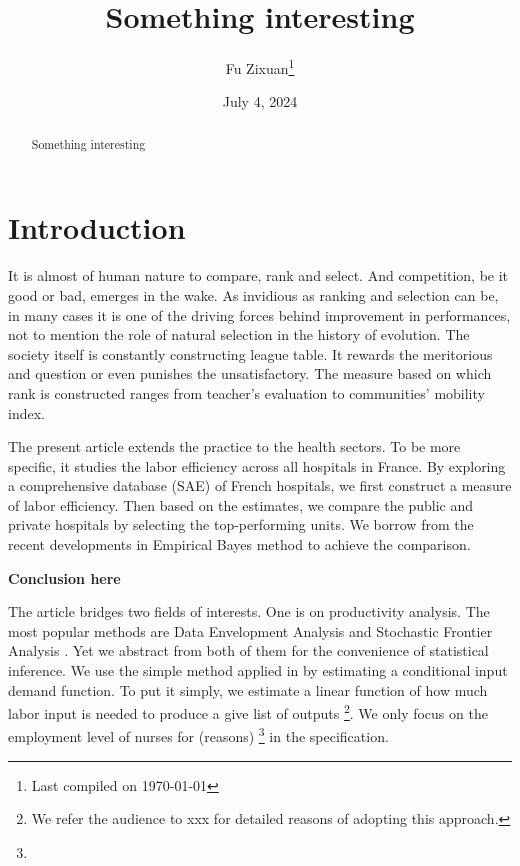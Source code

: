 \documentclass[12pt]{article}
\title{Something interesting}
\author{Fu Zixuan\thanks{Last compiled on \today}}
\date{July 4, 2024}
\begin{document}
\maketitle

\begin{abstract}
    \noindent  Something interesting\\


    \bigskip
\end{abstract}

\newpage
\tableofcontents
\newpage

\section{Introduction}

It is almost of human nature to compare, rank and select. And competition, be
it good or bad, emerges in the wake. As invidious as ranking and selection can
be, in many cases it is one of the driving forces behind improvement in
performances, not to mention the role of natural selection in the history of
evolution. The society itself is constantly constructing league table. It
rewards the meritorious and question or even punishes the unsatisfactory. The
measure based on which rank is constructed ranges from teacher's evaluation to
communities' mobility index.

The present article extends the practice to the health sectors. To be more
specific, it studies the labor efficiency across all hospitals in France. By
exploring a comprehensive database (SAE) of French hospitals, we first
construct a measure of labor efficiency. Then based on the estimates, we
compare the public and private hospitals by selecting the top-performing units.
We borrow from the recent developments in Empirical Bayes method to achieve the
comparison.

\textbf{Conclusion here}

The article bridges two fields of interests. One is on productivity analysis.
The most popular methods are Data Envelopment Analysis
\cite{charnes1978measuring} and Stochastic Frontier Analysis
\cite{aigner1977formulation,meeusen1977efficiency}. Yet we abstract from both
of them for the convenience of statistical inference. We use the simple method
applied in \cite{croiset2024hospitals} by estimating a conditional input demand
function. To put it simply, we estimate a linear function of how much labor
input is needed to produce a give list of outputs \footnote{We refer the
    audience to xxx for detailed reasons of adopting this approach.}. We only focus
on the employment level of nurses for (reasons) \footnote{} in the
specification.
\end{document}
